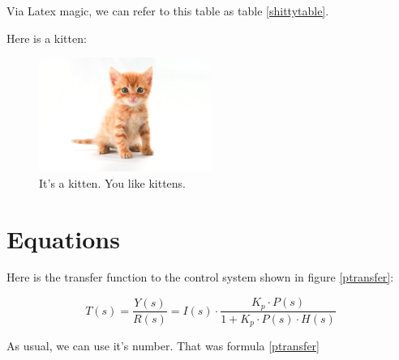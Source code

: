 \documentclass[12pt]{article}
\begin{document}
	Via Latex magic, we can refer to this table as table \ref{shittytable}.

	Here is a kitten:

    \begin{figure}[!ht]
        \label{kitten}
        \centering
        \includegraphics[width=0.5\textwidth]{kitten}
        \caption{It's a kitten. You like kittens.}
    \end{figure}

	\section{Equations}

	Here is the transfer function to the control system shown in figure \ref{ptransfer}:

    \begin{equation}
        \label{ptransfer}
        T(s)=\frac{Y(s)}{R(s)}=I(s) \cdot \frac{K_p \cdot P(s)}{1 + K_p \cdot P(s) \cdot H(s)}
    \end{equation}

	As usual, we can use it's number. That was formula \eqref{ptransfer}
	
    \printglossaries
    
    \printbibliography[heading=bibintoc]
	
\end{document}
